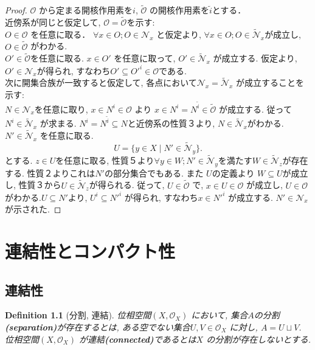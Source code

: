 \documentclass[lualatex]{ltjsbook}
\newtheorem{definition}[theorem]{Definition}
\theoremstyle{remark}
\theoremstyle{plain}
\begin{document}
\begin{proof}
	$\mathcal{O}$ から定まる開核作用素を$i$,   $\tilde{\mathcal{O}}$ の開核作用素を$\tilde{i}$とする．\\
	近傍系が同じと仮定して,  $\mathcal{O} = \tilde{\mathcal{O}}$を示す: \\
	$O \in \mathcal{O}$ を任意に取る．
	$\forall x \in O; O \in \mathcal{N}_x$ と仮定より,  $\forall x \in O; O \in  \mathcal{\tilde{N}}_x$が成立し,  $O \in \tilde{\mathcal{O}}$ がわかる.\\
	$O' \in  \tilde{\mathcal{O}}$を任意に取る. 
	$x \in O'$ を任意に取って,  $O' \in  \mathcal{\tilde{N}}_x$ が成立する.
	仮定より,  $O' \in \mathcal{N}_x$が得られ,  
すなわち$ O' \subseteq  O'^{i} \in \mathcal{O}$である.\\
	次に開集合族が一致すると仮定して,  各点において$\mathcal{N}_x = \mathcal{\tilde{N}}_x$ が成立することを示す:\\
	$N \in \mathcal{N}_x$を任意に取り,  $x \in N^{i} \in \mathcal{O}$ より
	$x \in  N^{i} = N^{\tilde{i}}\in  \tilde{\mathcal{O}}$ が成立する. 
	従って$N^{i} \in \mathcal{\tilde{N}}_x$ が求まる.
	$N^{i} = N^{\tilde{i}} \subseteq N$と近傍系の性質３より,  $N \in \mathcal{\tilde{N}}_x$がわかる.\\
	$N' \in \mathcal{\tilde{N}}_x$ を任意に取る. 
	\[
		U =\{y \in X  \mid N' \in \mathcal{\tilde{N}}_y\} 
	.\] 
	とする. $z \in U$を任意に取る,  性質５より$\forall y \in W; N' \in \mathcal{\tilde{N}}_y$を満たす$W \in \mathcal{\tilde{N}}_z$が存在する. 性質２よりこれは$N'$の部分集合でもある. また $U$の定義より $W \subseteq U$が成立し,  性質３から$U \in \mathcal{\tilde{N}}_z$が得られる. 従って,  $U \in \tilde{\mathcal{O}}$ で,  $x \in U \in \mathcal{O}$ が成立し,  $U \in \mathcal{O}$ がわかる.$U \subseteq N'$より,  $U^{i} \subseteq N'^{i}$ が得られ,  すなわち$x \in N'^{i}$ が成立する. $N' \in \mathcal{N}_x$が示された.
\end{proof}

\chapter{連結性とコンパクト性}%
\label{cha:連結性とコンパクト性}


\section{連結性}

\begin{definition}[分割,  連結]
	位相空間$\left( X ,  \mathcal{O}_X \right) $ において,  集合$A$の分割\textbf{(separation)}が存在するとは,  ある空でない集合$U, V \in \mathcal{O}_X$ に対し,  $A=U \sqcup   V $. 位相空間$\left( X, \mathcal{O}_X \right) $ が連結\textbf{(connected)}であるとは$X$ の分割が存在しないとする.
\end{definition} 
\end{document}

